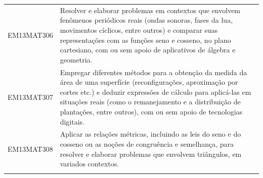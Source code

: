 \documentclass[12pt]{extarticle}
\begin{document}
\begin{longtable}{ll}
EM13MAT306 & Resolver e elaborar problemas em contextos que envolvem fenômenos periódicos reais (ondas sonoras, fases da lua, movimentos cíclicos, entre outros) e comparar suas representações com as funções seno e cosseno, no plano cartesiano, com ou sem apoio de aplicativos de álgebra e geometria.                                                                                                                                                                                                                                                                                                                                                                                                                                                                                                                        \\
\rowcolor[HTML]{E0F7FA} 
EM13MAT307 & Empregar diferentes métodos para a obtenção da medida da área de uma superfície (reconfigurações, aproximação por cortes etc.) e deduzir expressões de cálculo para aplicá-las em situações reais (como o remanejamento e a distribuição de plantações, entre outros), com ou sem apoio de tecnologias digitais.                                                                                                                                                                                                                                                                                                                                                                                                                                                                                                      \\
\rowcolor[HTML]{FFF} 
EM13MAT308 & Aplicar as relações métricas, incluindo as leis do seno e do cosseno ou as noções de congruência e semelhança, para resolver e elaborar problemas que envolvem triângulos, em variados contextos.                                                                                                                                                                                                                                                                                                                                                                                                                                                                                                                                                                                                                     \\
\rowcolor[HTML]{E0F7FA} 

\end{longtable}
\end{document}
